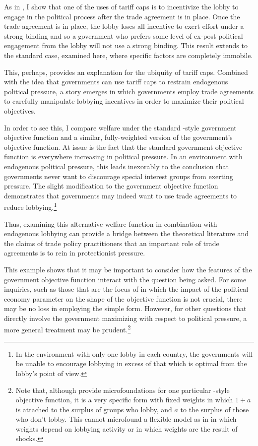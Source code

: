 As in \Textcite{mrc2007}, I show that one of the uses of tariff caps is to incentivize the lobby to engage in the political process after the trade agreement is in place. Once the trade agreement is in place, the lobby loses all incentive to exert effort under a strong binding and so a government who prefers some level of ex-post political engagement from the lobby will not use a strong binding. This result extends \Textcite{mrc2007} to the standard case, examined here, where specific factors are completely immobile. 

This, perhaps, provides an explanation for the ubiquity of tariff caps. Combined with the idea that governments can use tariff caps to restrain endogenous political pressure, a story emerges in which governments employ trade agreements to carefully manipulate lobbying incentives in order to maximize their political objectives.
	
In order to see this, I compare welfare under the standard \Textcite{baldwin}-style government objective function and a similar, fully-weighted version of the government's objective function. At issue is the fact that the standard government objective function is everywhere increasing in political pressure. In an environment with endogenous political pressure, this leads inexorably to the conclusion that governments never want to discourage special interest groups from exerting pressure. The slight modification to the government objective function demonstrates that governments may indeed want to use trade agreements to reduce lobbying.\footnote{In the environment with only one lobby in each country, the governments will be unable to encourage lobbying in excess of that which is optimal from the lobby's point of view.}

Thus, examining this alternative welfare function in combination with endogenous lobbying can provide a bridge between the theoretical literature and the claims of trade policy practitioners that an important role of trade agreements is to rein in protectionist pressure.

This example shows that it may be important to consider how the features of the government objective function interact with the question being asked. For some inquiries, such as those that are the focus of \Textcite{ms2011, ms2012a} in which the impact of the political economy parameter on the shape of the objective function is not crucial, there may be no loss in employing the simple form. However, for other questions that directly involve the government maximizing with respect to political pressure, a more general treatment may be prudent.\footnote{Note that, although \Textcite{gh94} provide microfoundations for one particular \Textcite{baldwin}-style objective function, it is a very specific form with fixed weights in which $1+a$ is attached to the surplus of groups who lobby, and $a$ to the surplus of those who don't lobby. This cannot microfound a flexible model as in \Textcite{longvousden} in which weights depend on lobbying activity or in which weights are the result of shocks.}

